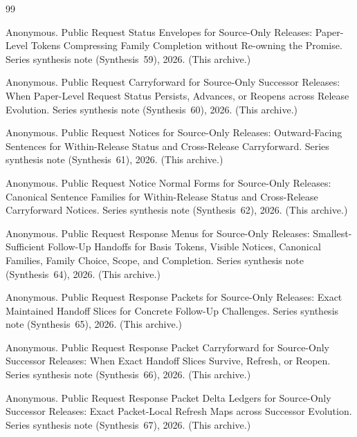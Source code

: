 \documentclass[11pt]{article}
\begin{document}
\begin{thebibliography}{99}\small

Anonymous.
\newblock Public Request Status Envelopes for Source-Only Releases: Paper-Level Tokens Compressing Family Completion without Re-owning the Promise.
\newblock Series synthesis note (Synthesis~59), 2026. (This archive.)

Anonymous.
\newblock Public Request Carryforward for Source-Only Successor Releases: When Paper-Level Request Status Persists, Advances, or Reopens across Release Evolution.
\newblock Series synthesis note (Synthesis~60), 2026. (This archive.)

Anonymous.
\newblock Public Request Notices for Source-Only Releases: Outward-Facing Sentences for Within-Release Status and Cross-Release Carryforward.
\newblock Series synthesis note (Synthesis~61), 2026. (This archive.)

Anonymous.
\newblock Public Request Notice Normal Forms for Source-Only Releases: Canonical Sentence Families for Within-Release Status and Cross-Release Carryforward Notices.
\newblock Series synthesis note (Synthesis~62), 2026. (This archive.)

Anonymous.
\newblock Public Request Response Menus for Source-Only Releases: Smallest-Sufficient Follow-Up Handoffs for Basis Tokens, Visible Notices, Canonical Families, Family Choice, Scope, and Completion.
\newblock Series synthesis note (Synthesis~64), 2026. (This archive.)

Anonymous.
\newblock Public Request Response Packets for Source-Only Releases: Exact Maintained Handoff Slices for Concrete Follow-Up Challenges.
\newblock Series synthesis note (Synthesis~65), 2026. (This archive.)

Anonymous.
\newblock Public Request Response Packet Carryforward for Source-Only Successor Releases: When Exact Handoff Slices Survive, Refresh, or Reopen.
\newblock Series synthesis note (Synthesis~66), 2026. (This archive.)

Anonymous.
\newblock Public Request Response Packet Delta Ledgers for Source-Only Successor Releases: Exact Packet-Local Refresh Maps across Successor Evolution.
\newblock Series synthesis note (Synthesis~67), 2026. (This archive.)


\end{thebibliography}
\end{document}
